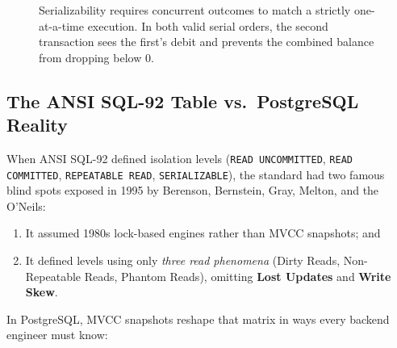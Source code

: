 \begin{figure}[htbp]
\caption{Serializability requires concurrent outcomes to match a strictly one-at-a-time execution. In both valid serial orders, the second transaction sees the first's debit and prevents the combined balance from dropping below 0.}
\label{ch06:fig-serializability}
\end{figure}

\subsection{The ANSI SQL-92 Table vs.\ PostgreSQL Reality}

When ANSI SQL-92 defined isolation levels (\texttt{READ UNCOMMITTED}, \texttt{READ COMMITTED}, \texttt{REPEATABLE READ}, \texttt{SERIALIZABLE}), the standard had two famous blind spots exposed in 1995 by Berenson, Bernstein, Gray, Melton, and the O'Neils:
\begin{enumerate}
  \item It assumed 1980s lock-based engines rather than MVCC snapshots; and
  \item It defined levels using only \emph{three read phenomena} (Dirty Reads, Non-Repeatable Reads, Phantom Reads), omitting \textbf{Lost Updates} and \textbf{Write Skew}.
\end{enumerate}

In PostgreSQL, MVCC snapshots reshape that matrix in ways every backend engineer must know:


